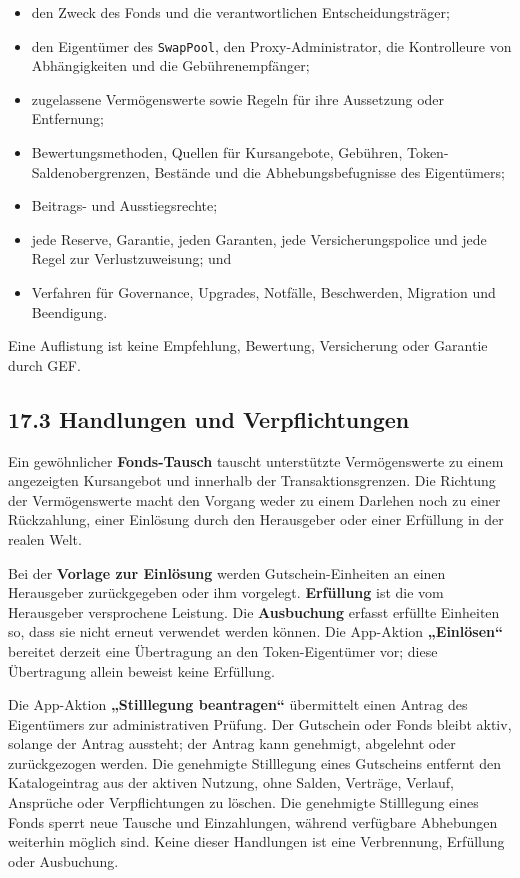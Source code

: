 \documentclass[11pt]{article}
\begin{document}
\begin{itemize}[leftmargin=*]
\item den Zweck des Fonds und die verantwortlichen Entscheidungsträger;
\item den Eigentümer des \texttt{SwapPool}, den Proxy-Administrator, die Kontrolleure von Abhängigkeiten und die Gebührenempfänger;
\item zugelassene Vermögenswerte sowie Regeln für ihre Aussetzung oder Entfernung;
\item Bewertungsmethoden, Quellen für Kursangebote, Gebühren, Token-Saldenobergrenzen, Bestände und die Abhebungsbefugnisse des Eigentümers;
\item Beitrags- und Ausstiegsrechte;
\item jede Reserve, Garantie, jeden Garanten, jede Versicherungspolice und jede Regel zur Verlustzuweisung; und
\item Verfahren für Governance, Upgrades, Notfälle, Beschwerden, Migration und Beendigung.
\end{itemize}
Eine Auflistung ist keine Empfehlung, Bewertung, Versicherung oder Garantie durch GEF.

\subsection*{17.3 Handlungen und Verpflichtungen}

Ein gewöhnlicher \textbf{Fonds-Tausch} tauscht unterstützte Vermögenswerte zu einem angezeigten Kursangebot und innerhalb der Transaktionsgrenzen. Die Richtung der Vermögenswerte macht den Vorgang weder zu einem Darlehen noch zu einer Rückzahlung, einer Einlösung durch den Herausgeber oder einer Erfüllung in der realen Welt.

Bei der \textbf{Vorlage zur Einlösung} werden Gutschein-Einheiten an einen Herausgeber zurückgegeben oder ihm vorgelegt. \textbf{Erfüllung} ist die vom Herausgeber versprochene Leistung. Die \textbf{Ausbuchung} erfasst erfüllte Einheiten so, dass sie nicht erneut verwendet werden können. Die App-Aktion \textbf{„Einlösen``} bereitet derzeit eine Übertragung an den Token-Eigentümer vor; diese Übertragung allein beweist keine Erfüllung.

Die App-Aktion \textbf{„Stilllegung beantragen``} übermittelt einen Antrag des Eigentümers zur administrativen Prüfung. Der Gutschein oder Fonds bleibt aktiv, solange der Antrag aussteht; der Antrag kann genehmigt, abgelehnt oder zurückgezogen werden. Die genehmigte Stilllegung eines Gutscheins entfernt den Katalogeintrag aus der aktiven Nutzung, ohne Salden, Verträge, Verlauf, Ansprüche oder Verpflichtungen zu löschen. Die genehmigte Stilllegung eines Fonds sperrt neue Tausche und Einzahlungen, während verfügbare Abhebungen weiterhin möglich sind. Keine dieser Handlungen ist eine Verbrennung, Erfüllung oder Ausbuchung.
\end{document}
